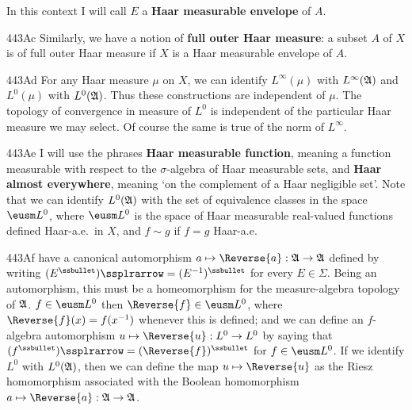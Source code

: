 In this context I will call $E$ a {\bf Haar measurable envelope} of $A$.

\spheader 443Ac Similarly, we have a notion of {\bf full outer Haar
measure}:  a subset $A$ of $X$ is of full outer Haar measure if $X$ is a
Haar measurable envelope of $A$.

\spheader 443Ad For any Haar measure $\mu$ on $X$, we can identify
$L^{\infty}(\mu)$ with $L^{\infty}(\frak A)$ and
$L^0(\mu)$ with $L^0(\frak A)$.
Thus these constructions are independent of $\mu$.   The topology of
convergence in measure of $L^0$ is independent of the
particular Haar measure we may select.     Of course the same is true of
the norm of $L^{\infty}$.   

\spheader 443Ae  I will use the
phrases {\bf
Haar measurable function}, meaning a function measurable with respect to
the $\sigma$-algebra of Haar measurable sets, and {\bf Haar almost
everywhere},
meaning `on the complement of a Haar negligible set'.   Note that we can
identify $L^0(\frak A)$ with the set of equivalence classes in the space
$\eusm L^0$, where $\eusm L^0$ is the space of Haar measurable
real-valued functions defined Haar-a.e.\ in $X$, and $f\sim g$ if $f=g$
Haar-a.e.   

\spheader 443Af  have a
canonical automorphism $a\mapsto\Reverse{a}:\frak A\to\frak A$ defined by
writing $(E^{\ssbullet})\ssplrarrow=(E^{-1})^{\ssbullet}$ for every
$E\in\Sigma$.   Being an automorphism, this must be a homeomorphism for
the measure-algebra topology of $\frak A$.
 $f\in\eusm L^0$ then
$\Reverse{f}\in\eusm L^0$, where $\Reverse{f}(x)=f(x^{-1})$ whenever this
is defined;  and we can define an $f$-algebra automorphism
$u\mapsto\Reverse{u}:L^0\to L^0$ by saying that
$(f^{\ssbullet})\ssplrarrow=(\Reverse{f})^{\ssbullet}$ for $f\in\eusm L^0$.   If
we identify $L^0$ with $L^0(\frak A)$, then we can define the map
$u\mapsto\Reverse{u}$ as the Riesz homomorphism associated with the Boolean
homomorphism $a\mapsto\Reverse{a}:\frak A\to\frak A$.

